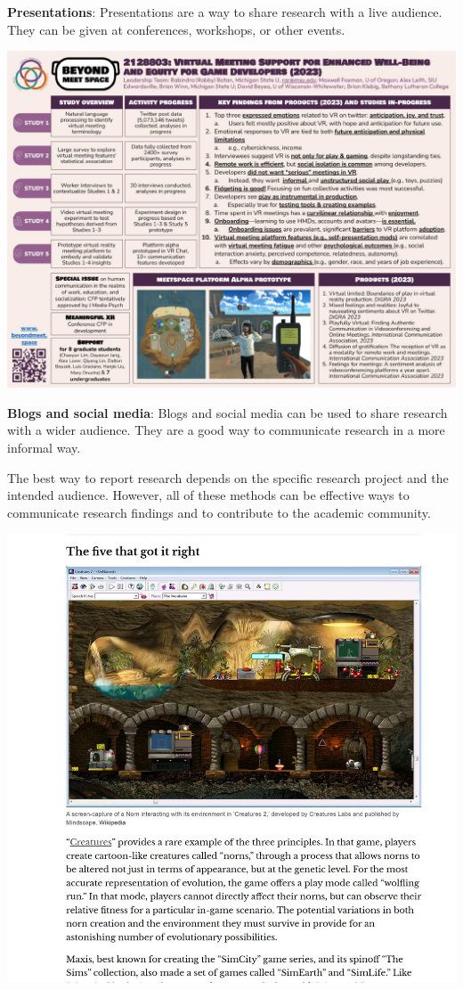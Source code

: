 \documentclass[
]{book}
\begin{document}
\textbf{Presentations}: Presentations are a way to share research with a live audience. They can be given at conferences, workshops, or other events.

\includegraphics[width=1\textwidth,height=\textheight]{images/BMS 2023 poster final.jpg}

\textbf{Blogs and social media}: Blogs and social media can be used to share research with a wider audience. They are a good way to communicate research in a more informal way.

The best way to report research depends on the specific research project and the intended audience. However, all of these methods can be effective ways to communicate research findings and to contribute to the academic community.

\includegraphics[width=1\textwidth,height=\textheight]{images/fig091.jpg}
\end{document}
